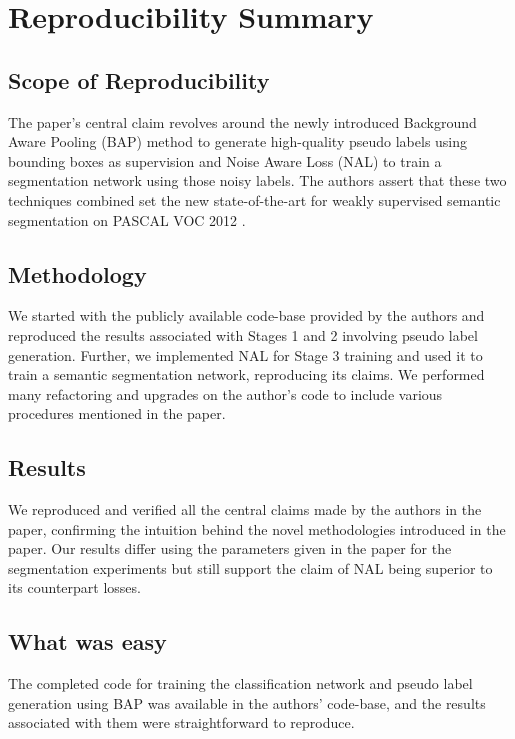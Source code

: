 \section*{Reproducibility Summary}

\subsection*{Scope of Reproducibility}

The paper's central claim revolves around the newly introduced Background Aware Pooling (BAP) method to generate high-quality pseudo labels using bounding boxes as supervision and Noise Aware Loss (NAL) to train a segmentation network using those noisy labels. The authors assert that these two techniques combined set the new state-of-the-art for weakly supervised semantic segmentation on PASCAL VOC 2012 \cite{pascal}. 

\subsection*{Methodology}

We started with the publicly available code-base provided by the authors and reproduced the results associated with Stages 1 and 2 involving pseudo label generation. Further, we implemented NAL for Stage 3 training and used it to train a semantic segmentation network, reproducing its claims. We performed many refactoring and upgrades on the author's code to include various procedures mentioned in the paper.

\subsection*{Results}

We reproduced and verified all the central claims made by the authors in the paper, confirming the intuition behind the novel methodologies introduced in the paper. Our results differ using the parameters given in the paper for the segmentation experiments but still support the claim of NAL being superior to its counterpart losses.

\subsection*{What was easy}
The completed code for training the classification network and pseudo label generation using BAP was available in the authors' code-base, and the results associated with them were straightforward to reproduce. 

